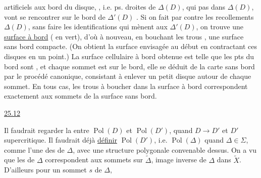 
artificiels aux bord du disque, , i.e.  ps. droites de $\Delta(D)$, qui  pas dans $\Delta(D)$, vont se rencontrer sur le bord de $\Delta'(D)$ \deleted{\unsure{;} }. Si on fait par contre les recollements   $\Delta(D)$, sans faire les identifications qui mènent aux $\Delta'(D)$, on trouve une \uline{surface à bord} ( en vert), d'où à nouveau, en bouchant les trous , une surface sans bord compacte. (On obtient la surface envisagée au début en contractant  ces disques en  un point.) La surface cellulaire à bord obtenue est telle que les pts du bord sont  , et chaque sommet est sur le bord, elle se déduit de la carte sans bord par le procédé canonique, consistant à enlever un petit disque autour de chaque sommet. En tous cas, les trous à boucher dans la surface à bord correspondent exactement aux sommets de la surface sans bord.


\uline{25.12}

Il faudrait regarder la  entre $\operatorname{Pol}(D)$ et $\operatorname{Pol}(D')$, quand $D\longrightarrow D'$ et $D'$ supercritique. Il faudrait déjà \uline{définir} $\operatorname{Pol}(D')$, i.e. $\operatorname{Pol}(\Delta)$ quand $\Delta\in\Sigma$, comme l'une des  de $\Delta$, avec une structure polygonale convenable dessus. On a vu que les   de $\Delta$ correspondent aux sommets sur $\widetilde\Delta$, image inverse de $\Delta$ dans $\widetilde X$. D'ailleurs pour un sommet $s$ de $\Delta$,

